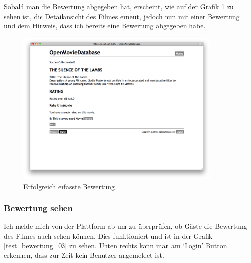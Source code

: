 Sobald man die Bewertung abgegeben hat, erscheint, wie auf der Grafik \ref{test_bewertung_02}
zu sehen ist, die Detailansicht des Filmes erneut, jedoch nun mit einer Bewertung
und dem Hinweis, dass ich bereits eine Bewertung abgegeben habe.

\begin{figure}[ht]
    \begin{center}
        \includegraphics[width=0.9\textwidth,angle=0]{./bilder/tests/test_bewertung_02.png}
        \caption{Erfolgreich erfasste Bewertung}
        \label{test_bewertung_02}
    \end{center}
\end{figure}

\clearpage

\subsubsection{Bewertung sehen}
Ich melde mich von der Plattform ab um zu überprüfen, ob Gäste die Bewertung
des Filmes auch sehen können. Dies funktioniert und ist in der Grafik \ref{test_bewertung_03}
zu sehen. Unten rechts kann man am `Login' Button erkennen, dass zur Zeit
kein Benutzer angemeldet ist.

